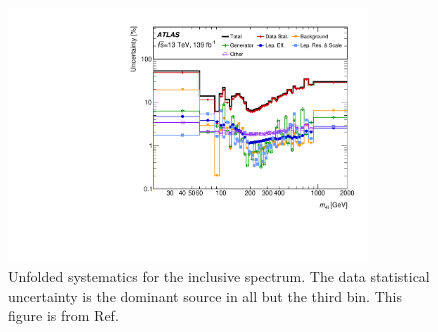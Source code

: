 \begin{figure}
    \centering
    \includegraphics[width=0.85\textwidth]{Figures/m4l/Systematics/UnfoldedSys_M4l_Stack_Paper.pdf}
    \caption{Unfolded systematics for the inclusive \mFourL{} spectrum. The data statistical uncertainty is the dominant source in all but the third bin. This figure is from Ref.~\cite{m4l2021_paper}}
    \label{fig:m4lsystematics}
\end{figure}
